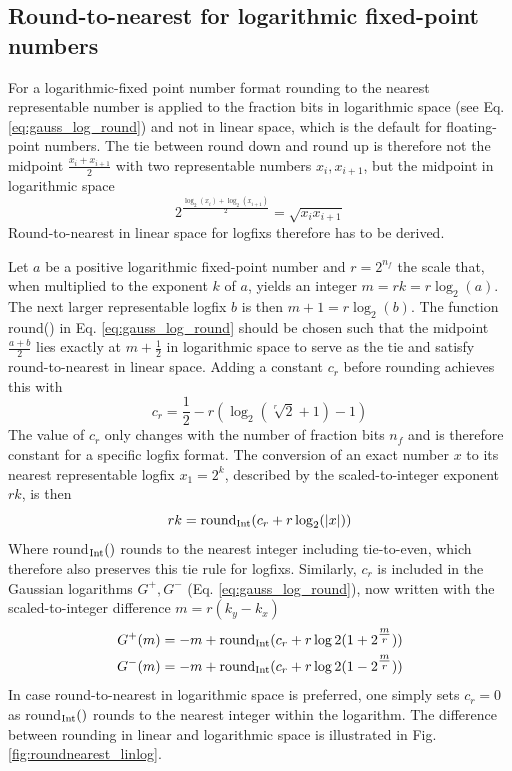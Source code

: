 \subsection{Round-to-nearest for logarithmic fixed-point numbers}
\label{sec:roundnearest_logfix}

For a logarithmic-fixed point number format rounding to the nearest representable number is applied to the fraction bits in
logarithmic space (see Eq. \ref{eq:gauss_log_round}) and not in linear space, which is the default for floating-point numbers.
The tie between round down and round up is therefore not the midpoint $\tfrac{x_i + x_{i+1}}{2}$ with two representable
numbers $x_i,x_{i+1}$, but the midpoint in logarithmic space
\begin{equation}
2^{\tfrac{\log_2(x_i) + \log_2(x_{i+1})}{2}} = \sqrt{x_ix_{i+1}}
\end{equation}
Round-to-nearest in linear space for logfixs therefore has to be derived.

Let $a$ be a positive logarithmic fixed-point number and $r = 2^{n_f}$ the scale that, when multiplied to the
exponent $k$ of $a$, yields an integer $m = rk = r\log_2(a)$. The next larger representable logfix $b$ is then 
$m + 1 = r \log_2(b)$. The function round() in Eq. \ref{eq:gauss_log_round} should be chosen such that the
midpoint $\tfrac{a+b}{2}$ lies exactly at $m + \tfrac{1}{2}$ in logarithmic space to serve as the tie and
satisfy round-to-nearest in linear space. Adding a constant $c_r$ before rounding achieves this with
\begin{equation}
c_r  = \frac{1}{2} - r(\log_2(\sqrt[r]{2} + 1)-1)
\label{eq:roundnearest_logfix_cr}
\end{equation}
The value of $c_r$ only changes with the number of fraction bits $n_f$ and is therefore constant for a specific
logfix format. The conversion of an exact number $x$ to its nearest representable logfix $x_1 = 2^k$, described
by the scaled-to-integer exponent $rk$, is then
\begin{equation}
rk = \text{round}_{\operatorname{Int}}(c_r + r\log_2(\vert x \vert))
\end{equation}
Where round$_{\operatorname{Int}}()$ rounds to the nearest integer including tie-to-even, which therefore also preserves
this tie rule for logfixs. Similarly, $c_r$ is included in the Gaussian logarithms $G^+,G^-$
(Eq. \ref{eq:gauss_log_round}), now written with the scaled-to-integer difference $m = r(k_y - k_x)$
\begin{align}
	G^+(m) &= -m + \text{round}_{\operatorname{Int}}( c_r + r\log2(1+2^{\tfrac{m}{r}})) \nonumber \\
	G^-(m) &= -m + \text{round}_{\operatorname{Int}}( c_r + r\log2(1-2^{\tfrac{m}{r}}))
\end{align}
In case round-to-nearest in logarithmic space is preferred, one simply sets $c_r = 0$ as round$_{\operatorname{Int}}()$
rounds to the nearest integer within the logarithm. The difference between rounding in linear and logarithmic
space is illustrated in Fig. \ref{fig:roundnearest_linlog}.

